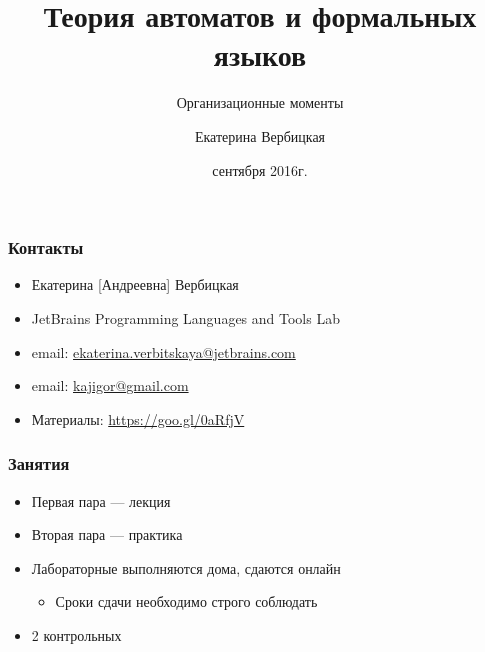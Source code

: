 \documentclass{beamer}
\title[]{Теория автоматов и формальных языков}
\subtitle[]{Организационные моменты}
\institute[]{
Санкт-Петербургский государственный электротехнический университет <<ЛЭТИ>>\\
}
\author[]{Екатерина Вербицкая}
\date{ сентября 2016г.}
\begin{document}
{
\begin{frame}
  \titlepage
\end{frame}

}

\begin{frame}[fragile]
  \transwipe[direction=90]
  \frametitle{Контакты}
  \begin{itemize}
    \item Екатерина [Андреевна] Вербицкая
    \item JetBrains Programming Languages and Tools Lab 
    \item email: \href{mailto:ekaterina.verbitskaya@jetbrains.com}{ekaterina.verbitskaya@jetbrains.com} 
    \item email: \href{mailto:kajigor@gmail.com}{kajigor@gmail.com} 
    \item Материалы: \href{https://goo.gl/0aRfjV}{https://goo.gl/0aRfjV}
  \end{itemize}
\end{frame}

\begin{frame}[fragile]
  \transwipe[direction=90]
  \frametitle{Занятия}
  \begin{itemize}
    \item Первая пара --- лекция
    \item Вторая пара --- практика
    \item Лабораторные выполняются дома, сдаются онлайн
    \begin{itemize}
      \item Сроки сдачи необходимо строго соблюдать
    \end{itemize}
    \item 2 контрольных
  \end{itemize}
\end{frame}
\end{document}
